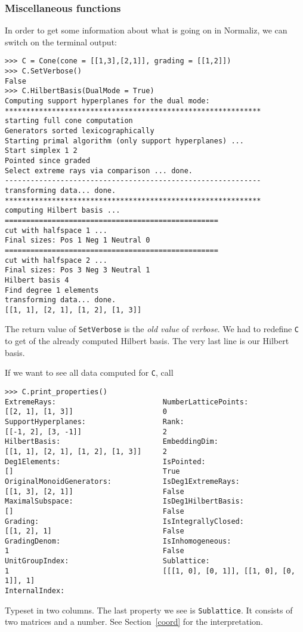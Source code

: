 \documentclass[12pt,a4paper]{scrartcl}
\theoremstyle{definition}
\begin{document}
\begin{small}
\subsubsection{Miscellaneous functions}
In order to get some information about what is going on in Normaliz, we can switch on the terminal output:
\begin{Verbatim}
>>> C = Cone(cone = [[1,3],[2,1]], grading = [[1,2]])
>>> C.SetVerbose()
False
>>> C.HilbertBasis(DualMode = True)
Computing support hyperplanes for the dual mode:
************************************************************
starting full cone computation
Generators sorted lexicographically
Starting primal algorithm (only support hyperplanes) ...
Start simplex 1 2 
Pointed since graded
Select extreme rays via comparison ... done.
------------------------------------------------------------
transforming data... done.
************************************************************
computing Hilbert basis ...
==================================================
cut with halfspace 1 ...
Final sizes: Pos 1 Neg 1 Neutral 0
==================================================
cut with halfspace 2 ...
Final sizes: Pos 3 Neg 3 Neutral 1
Hilbert basis 4
Find degree 1 elements
transforming data... done.
[[1, 1], [2, 1], [1, 2], [1, 3]]
\end{Verbatim}
The return value of \verb|SetVerbose| is the \emph{old value} of \emph{verbose}. We had to redefine \verb|C| to get of the already computed Hilbert basis. The very last line is our Hilbert basis.

If we want to see all data computed for \verb|C|, call
\begin{Verbatim}
>>> C.print_properties()
ExtremeRays:                         NumberLatticePoints:
[[2, 1], [1, 3]]                     0
SupportHyperplanes:                  Rank:
[[-1, 2], [3, -1]]                   2
HilbertBasis:                        EmbeddingDim:
[[1, 1], [2, 1], [1, 2], [1, 3]]     2
Deg1Elements:                        IsPointed:
[]                                   True
OriginalMonoidGenerators:            IsDeg1ExtremeRays:
[[1, 3], [2, 1]]                     False
MaximalSubspace:                     IsDeg1HilbertBasis:
[]                                   False
Grading:                             IsIntegrallyClosed:
[[1, 2], 1]                          False
GradingDenom:                        IsInhomogeneous:
1                                    False
UnitGroupIndex:                      Sublattice:
1                                    [[[1, 0], [0, 1]], [[1, 0], [0, 1]], 1]
InternalIndex:
\end{Verbatim}
Typeset in two columns. The last property we see is \verb|Sublattice|. It consists of two matrices and a number. See Section~\ref{coord} for the interpretation.


\end{small}
\end{document}
